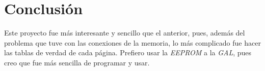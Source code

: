 \documentclass[12pt, oneside, openany]{article}
\begin{document}
\section{Conclusión}
{\sffamily\large
    \hspace{0.5cm} Este proyecto fue más interesante y sencillo que el anterior, pues, además del problema que tuve con las conexiones de la memoria, lo más complicado fue hacer las tablas de verdad de cada página. Prefiero usar la \emph{EEPROM} a la \emph{GAL}, pues creo que fue más sencilla de programar y usar.
}
\end{document}
